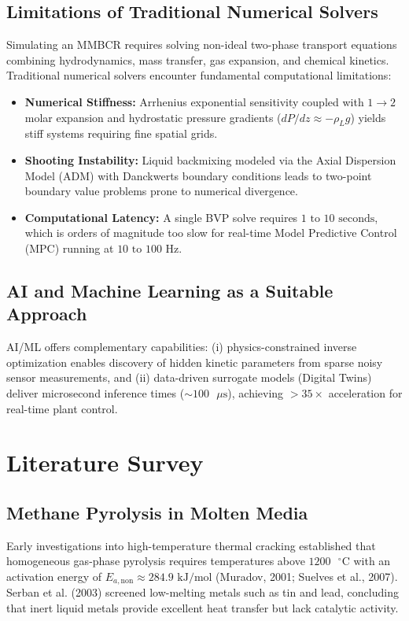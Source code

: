 \documentclass[12pt,a4paper,oneside]{report}
\begin{document}
\section{Limitations of Traditional Numerical Solvers}
Simulating an MMBCR requires solving non-ideal two-phase transport equations combining hydrodynamics, mass transfer, gas expansion, and chemical kinetics. Traditional numerical solvers encounter fundamental computational limitations:
\begin{itemize}
    \item \textbf{Numerical Stiffness:} Arrhenius exponential sensitivity coupled with $1 \rightarrow 2$ molar expansion and hydrostatic pressure gradients ($dP/dz \approx -\rho_L g$) yields stiff systems requiring fine spatial grids.
    \item \textbf{Shooting Instability:} Liquid backmixing modeled via the Axial Dispersion Model (ADM) with Danckwerts boundary conditions leads to two-point boundary value problems prone to numerical divergence.
    \item \textbf{Computational Latency:} A single BVP solve requires $1\text{ to }10\text{ seconds}$, which is orders of magnitude too slow for real-time Model Predictive Control (MPC) running at $10\text{ to }100\text{ Hz}$.
\end{itemize}

\section{AI and Machine Learning as a Suitable Approach}
AI/ML offers complementary capabilities: (i) physics-constrained inverse optimization enables discovery of hidden kinetic parameters from sparse noisy sensor measurements, and (ii) data-driven surrogate models (Digital Twins) deliver microsecond inference times (${\sim}100\text{ }\mu\text{s}$), achieving $>35\times$ acceleration for real-time plant control.

\chapter{Literature Survey}
\section{Methane Pyrolysis in Molten Media}
Early investigations into high-temperature thermal cracking established that homogeneous gas-phase pyrolysis requires temperatures above $1200\text{ }^\circ\text{C}$ with an activation energy of $E_{a,\text{non}} \approx 284.9\text{ kJ/mol}$ (Muradov, 2001; Suelves et al., 2007). Serban et al. (2003) screened low-melting metals such as tin and lead, concluding that inert liquid metals provide excellent heat transfer but lack catalytic activity.
\end{document}
